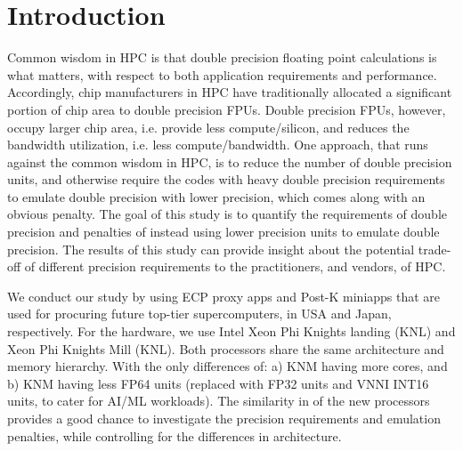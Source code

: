 \section{Introduction}

Common wisdom in HPC is that double precision floating point calculations is what matters, with respect to both application requirements and performance.
Accordingly, chip manufacturers in HPC have traditionally allocated a significant portion of chip area to double precision FPUs.
Double precision FPUs, however, occupy larger chip area, i.e. provide less compute/silicon, and reduces the bandwidth utilization, i.e. less compute/bandwidth. One approach, that runs against the common wisdom in HPC, is to reduce the number of double precision units, and otherwise require the codes with heavy double precision requirements to emulate double precision with lower precision, which comes along with an obvious penalty.
The goal of this study is to quantify the requirements of double precision and penalties of instead using lower precision units to emulate double precision.
The results of this study can provide insight about the potential trade-off of different precision requirements to the practitioners, and vendors, of HPC.

We conduct our study by using ECP proxy apps and Post-K miniapps that are used for procuring future top-tier supercomputers, in USA and Japan, respectively.
For the hardware, we use Intel Xeon Phi Knights landing (KNL) and Xeon Phi Knights Mill (KNL).
Both processors share the same architecture and memory hierarchy.
With the only differences of: a) KNM having more cores, and b) KNM having less FP64 units (replaced with FP32 units and VNNI INT16 units, to cater for AI/ML workloads).
The similarity in of the new processors provides a good chance to investigate the precision requirements and emulation penalties, while controlling for the differences in architecture.

